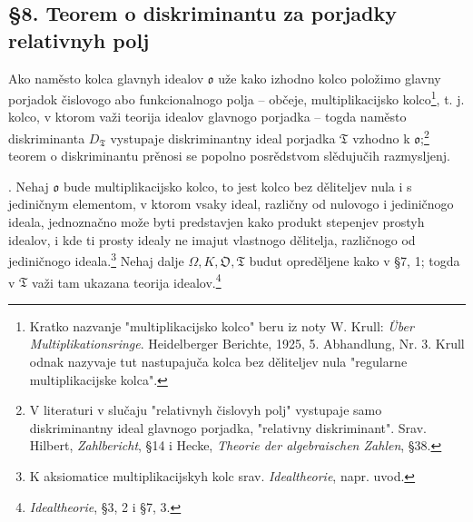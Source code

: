 \documentclass[11pt]{article}
\newcommand{\mo}{\mathfrak{o}}
\newcommand{\mO}{\mathfrak{O}}
\newcommand{\mT}{\mathfrak{T}}
\begin{document}
\setcounter{footnote}{29}

\subsection*{§8. Teorem o diskriminantu za porjadky relativnyh polj}

\noindent Ako naměsto kolca glavnyh idealov $\mo$ uže kako izhodno kolco položimo glavny porjadok čislovogo abo funkcionalnogo polja -- občeje, multiplikacijsko kolco\footnote{Kratko nazvanje "multiplikacijsko kolco" beru iz noty W. Krull: \emph{Über Multiplikationsringe}. Heidelberger Berichte, 1925, 5. Abhandlung, Nr. 3. Krull odnak nazyvaje tut nastupajuča kolca bez děliteljev nula "regularne multiplikacijske kolca".}, t. j. kolco, v ktorom važi teorija idealov glavnogo porjadka -- togda naměsto diskriminanta $D_\mT$ vystupaje diskriminantny ideal porjadka $\mT$ vzhodno k $\mo$;\footnote{V literaturi v slučaju "relativnyh čislovyh polj" vystupaje samo diskriminantny ideal glavnogo porjadka, "relativny diskriminant". Srav. Hilbert, \emph{Zahlbericht}, §14 i Hecke, \emph{Theorie der algebraischen Zahlen}, §38.} teorem o diskriminantu prěnosi se popolno posrědstvom slědujučih razmysljenj.

. Nehaj $\mo$ bude multiplikacijsko kolco, to jest kolco bez děliteljev nula i s jediničnym elementom, v ktorom vsaky ideal, različny od nulovogo i jediničnogo ideala, jednoznačno može byti predstavjen kako produkt stepenjev prostyh idealov, i kde ti prosty idealy ne imajut vlastnogo dělitelja, različnogo od jediničnogo ideala.\footnote{K aksiomatice multiplikacijskyh kolc srav. \emph{Idealtheorie}, napr. uvod.} Nehaj dalje $\Omega,K,\mO,\mT$ budut opreděljene kako v §7, 1; togda v $\mT$ važi tam ukazana teorija idealov.\footnote{\emph{Idealtheorie}, §3, 2 i §7, 3.}
\end{document}
